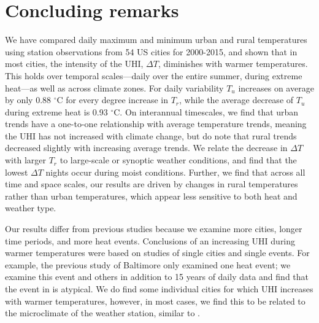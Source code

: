 {\section{Concluding remarks}

We have compared daily maximum and minimum urban and rural temperatures using station observations from 54 US cities for 2000-2015, and shown that in most cities, the intensity of the UHI, $\Delta T$,  diminishes with warmer temperatures.  This holds over temporal scales---daily over the entire summer, during extreme heat---as well as across climate zones. For daily variability $T_u$ increases on average by only 0.88 $^\circ$C for every degree increase in $T_r$, while the average decrease of $T_u$ during extreme heat is 0.93 $^\circ$C. %
On interannual timescales, we find that urban trends have a one-to-one relationship with average temperature trends, meaning the UHI has not increased with climate change, but do note that rural trends decreased slightly with increasing average trends. We relate the decrease in $\Delta T$ with larger $T_r$ to large-scale or synoptic weather conditions, and find that the lowest $\Delta T$ nights occur during moist conditions. Further, we find that across all time and space scales, our results are driven by changes in rural temperatures rather than urban temperatures, which appear less sensitive to both heat and weather type. 

Our results differ from previous studies because we examine more cities, longer time periods, and more heat events. Conclusions of an increasing UHI during warmer temperatures were based on studies of single cities and single events. For example, the previous study of Baltimore \citep{li2013synergistic} only examined one heat event; we examine this event and others in addition to 15 years of daily data and find that the event in \cite{li2013synergistic} is atypical. We do find some individual cities for which UHI increases with warmer temperatures, however, in most cases, we find this to be related to the microclimate of the weather station, similar to \cite{zhou2010atlanta}. 

}

